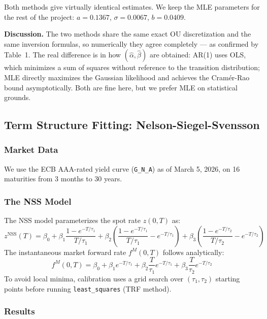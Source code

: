 \documentclass[12pt, a4paper]{article}
\begin{document}
Both methods give virtually identical estimates. We keep the MLE parameters for the rest of the project: $a = 0.1367$, $\sigma = 0.0067$, $b = 0.0409$.

\textbf{Discussion.} The two methods share the same exact OU discretization and the same inversion formulas, so numerically they agree completely — as confirmed by Table~1. The real difference is in how $(\hat{\alpha}, \hat{\beta})$ are obtained: AR(1) uses OLS, which minimizes a sum of squares without reference to the transition distribution; MLE directly maximizes the Gaussian likelihood and achieves the Cramér-Rao bound asymptotically. Both are fine here, but we prefer MLE on statistical grounds.

\subsection{Term Structure Fitting: Nelson-Siegel-Svensson}

\subsubsection{Market Data}

We use the ECB AAA-rated yield curve (\texttt{G\_N\_A}) as of March 5, 2026, on 16 maturities from 3 months to 30 years.

\subsubsection{The NSS Model}

The NSS model parameterizes the spot rate $z(0,T)$ as:
\begin{equation}
z^{\text{NSS}}(T) = \beta_0 + \beta_1 \frac{1-e^{-T/\tau_1}}{T/\tau_1} + \beta_2\!\left(\frac{1-e^{-T/\tau_1}}{T/\tau_1} - e^{-T/\tau_1}\right) + \beta_3\!\left(\frac{1-e^{-T/\tau_2}}{T/\tau_2} - e^{-T/\tau_2}\right)
\end{equation}
The instantaneous market forward rate $f^M(0,T)$ follows analytically:
\begin{equation}
f^M(0,T) = \beta_0 + \beta_1 e^{-T/\tau_1} + \beta_2 \frac{T}{\tau_1} e^{-T/\tau_1} + \beta_3 \frac{T}{\tau_2} e^{-T/\tau_2}
\end{equation}
To avoid local minima, calibration uses a grid search over $(\tau_1, \tau_2)$ starting points before running \texttt{least\_squares} (TRF method).

\subsubsection{Results}
\end{document}
